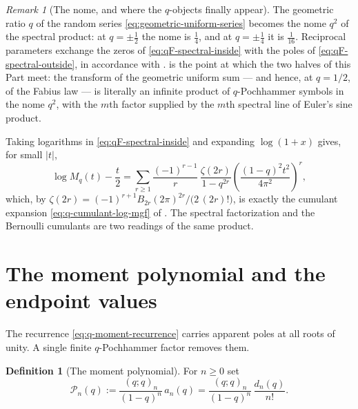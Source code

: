\documentclass[11pt,oneside,openany]{book}
\theoremstyle{definition}
\newtheorem{definition}[definition]{Definition}
\theoremstyle{remark}
\newtheorem{remark}[remark]{Remark}
\newcommand{\poch}[3]{(#1;#2)_{#3}}
\newcommand{\abs}[1]{\lvert #1\rvert}
\newcommand{\defeq}{\mathrel{:=}}
\begin{document}
\begin{remark}[The nome, and where the $q$-objects finally appear]\label{rem:qF-nome}
The geometric ratio $q$ of the random series \eqref{eq:geometric-uniform-series}
becomes the nome $q^2$ of the spectral product: at $q=\pm\tfrac12$ the nome is
$\tfrac14$, and at $q=\pm\tfrac14$ it is $\tfrac1{16}$.  Reciprocal parameters
exchange the zeros of \eqref{eq:qF-spectral-inside} with the poles of
\eqref{eq:qF-spectral-outside}, in accordance with .
 is the point at which the two halves of this Part meet:
the transform of the geometric uniform sum --- and hence, at $q=1/2$, of the
Fabius law --- is literally an infinite product of $q$-Pochhammer symbols in the
nome $q^2$, with the $m$th factor supplied by the $m$th spectral line of Euler's
sine product.

Taking logarithms in \eqref{eq:qF-spectral-inside} and expanding $\log(1+x)$
gives, for small $\abs t$,
\[
 \log M_q(t)-\frac t2
 =\sum_{r\ge1}\frac{(-1)^{r-1}}{r}\,
   \frac{\zeta(2r)}{1-q^{2r}}\left(\frac{(1-q)^2t^2}{4\pi^2}\right)^{\!r},
\]
which, by $\zeta(2r)=(-1)^{r+1}B_{2r}(2\pi)^{2r}/\bigl(2\,(2r)!\bigr)$, is
exactly the cumulant expansion \eqref{eq:q-cumulant-log-mgf} of
.  The spectral factorization and the Bernoulli
cumulants are two readings of the same product.
\end{remark}


\section{The moment polynomial and the endpoint values}

The recurrence \eqref{eq:q-moment-recurrence} carries apparent poles at all
roots of unity.  A single finite $q$-Pochhammer factor removes them.

\begin{definition}[The moment polynomial]\label{def:qF-moment-polynomial}
For $n\ge0$ set
\begin{equation}\label{eq:qF-moment-polynomial}
 \mathcal P_n(q)\defeq\frac{\poch qqn}{(1-q)^n}\,a_n(q)
 =\frac{\poch qqn}{(1-q)^n}\,\frac{d_n(q)}{n!}.
\end{equation}
\end{definition}
\end{document}
